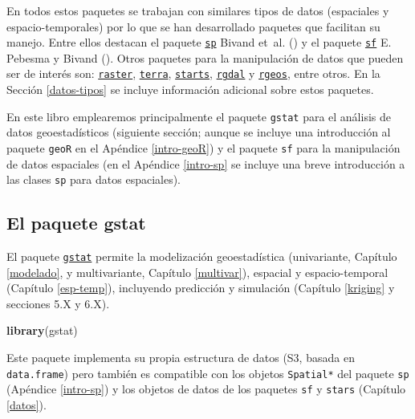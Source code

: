 \documentclass[
]{book}
\newenvironment{Shaded}{\begin{snugshade}}{\end{snugshade}}
\newcommand{\FunctionTok}[1]{\textcolor[rgb]{0.13,0.29,0.53}{\textbf{#1}}}
\newcommand{\NormalTok}[1]{#1}
\theoremstyle{break}
\theoremstyle{definition}
\theoremstyle{definition}
\theoremstyle{definition}
\theoremstyle{definition}
\theoremstyle{remark}
\begin{document}
En todos estos paquetes se trabajan con similares tipos de datos (espaciales y espacio-temporales) por lo que se han desarrollado paquetes que facilitan su manejo.
Entre ellos destacan el paquete \href{https://CRAN.R-project.org/package=sp}{\texttt{sp}} Bivand et~al. () y el paquete \href{https://r-spatial.github.io/sf}{\texttt{sf}} E. Pebesma y Bivand ().
Otros paquetes para la manipulación de datos que pueden ser de interés son: \href{https://CRAN.R-project.org/package=raster}{\texttt{raster}}, \href{https://CRAN.R-project.org/package=terra}{\texttt{terra}}, \href{https://r-spatial.github.io/stars}{\texttt{starts}}, \href{https://CRAN.R-project.org/package=rgdal}{\texttt{rgdal}} y \href{https://CRAN.R-project.org/package=rgeos}{\texttt{rgeos}}, entre otros.
En la Sección \ref{datos-tipos} se incluye información adicional sobre estos paquetes.

En este libro emplearemos principalmente el paquete \texttt{gstat} para el análisis de datos geoestadísticos (siguiente sección; aunque se incluye una introducción al paquete \texttt{geoR} en el Apéndice \ref{intro-geoR}) y el paquete \texttt{sf} para la manipulación de datos espaciales (en el Apéndice \ref{intro-sp} se incluye una breve introducción a las clases \texttt{sp} para datos espaciales).

\subsection{\texorpdfstring{El paquete \textbf{gstat}}{El paquete gstat}}\label{gstat-pkg}

El paquete \href{https://r-spatial.github.io/gstat}{\texttt{gstat}} permite la modelización geoestadística (univariante, Capítulo \ref{modelado}, y multivariante, Capítulo \ref{multivar}), espacial y espacio-temporal (Capítulo \ref{esp-temp}), incluyendo predicción y simulación (Capítulo \ref{kriging} y secciones 5.X y 6.X).

\begin{Shaded}
\begin{Highlighting}[]
\FunctionTok{library}\NormalTok{(gstat)}
\end{Highlighting}
\end{Shaded}

Este paquete implementa su propia estructura de datos (S3, basada en \texttt{data.frame}) pero también es compatible con los objetos \texttt{Spatial*} del paquete \texttt{sp} (Apéndice \ref{intro-sp}) y los objetos de datos de los paquetes \texttt{sf} y \texttt{stars} (Capítulo \ref{datos}).
\end{document}
